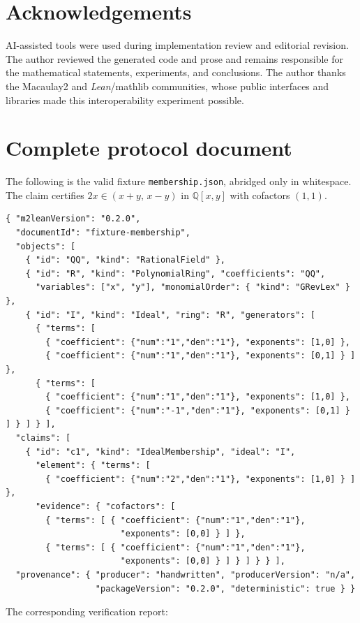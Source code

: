 \documentclass[11pt]{article}
\newcommand{\lean}{\textit{Lean}}
\newcommand{\mathlib}{\textsf{mathlib}}
\newcommand{\QQ}{\mathbb{Q}}
\newcommand{\code}[1]{\texttt{#1}}
\begin{document}
\section*{Acknowledgements}
AI-assisted tools were used during implementation review and editorial
revision.  The author
reviewed the generated code and prose and remains responsible for the
mathematical statements, experiments, and conclusions.  The author
thanks the Macaulay2 and \lean{}/\mathlib{} communities, whose public interfaces
and libraries made this interoperability experiment possible.

\appendix

\section{Complete protocol document}\label{app:doc}

The following is the valid fixture \code{membership.json}, abridged only in
whitespace.  The claim certifies $2x \in (x+y,\, x-y)$ in
$\QQ[x,y]$ with cofactors $(1,1)$.

\begin{lstlisting}[style=jsonstyle]
{ "m2leanVersion": "0.2.0",
  "documentId": "fixture-membership",
  "objects": [
    { "id": "QQ", "kind": "RationalField" },
    { "id": "R", "kind": "PolynomialRing", "coefficients": "QQ",
      "variables": ["x", "y"], "monomialOrder": { "kind": "GRevLex" } },
    { "id": "I", "kind": "Ideal", "ring": "R", "generators": [
      { "terms": [
        { "coefficient": {"num":"1","den":"1"}, "exponents": [1,0] },
        { "coefficient": {"num":"1","den":"1"}, "exponents": [0,1] } ] },
      { "terms": [
        { "coefficient": {"num":"1","den":"1"}, "exponents": [1,0] },
        { "coefficient": {"num":"-1","den":"1"}, "exponents": [0,1] } ] } ] } ],
  "claims": [
    { "id": "c1", "kind": "IdealMembership", "ideal": "I",
      "element": { "terms": [
        { "coefficient": {"num":"2","den":"1"}, "exponents": [1,0] } ] },
      "evidence": { "cofactors": [
        { "terms": [ { "coefficient": {"num":"1","den":"1"},
                       "exponents": [0,0] } ] },
        { "terms": [ { "coefficient": {"num":"1","den":"1"},
                       "exponents": [0,0] } ] } ] } } ],
  "provenance": { "producer": "handwritten", "producerVersion": "n/a",
                  "packageVersion": "0.2.0", "deterministic": true } }
\end{lstlisting}

The corresponding verification report:
\end{document}
